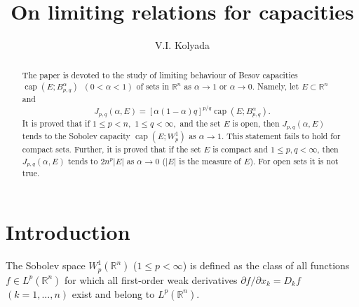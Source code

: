 \documentclass[12pt,twoside,reqno]{amsart}
\numberwithin{equation}{section}
\theoremstyle{definition}
\numberwithin{equation}{section}
\begin{document}
\title[Limiting relations]{On limiting relations for capacities}

\author[V.I. Kolyada]{V.I. Kolyada}
\address{Department of Mathematics\\
Karlstad University\\
Universitetsgatan 1 \\
651 88 Karlstad\\
SWEDEN} 


\begin{abstract}

The paper is devoted to the study of limiting behaviour of Besov
capacities ${\operatorname{cap}} (E;B_{p,q}^{\alpha})\,\,\, (0<{\alpha}<1)$ of sets in ${\mathbb{R}}^n$ as ${\alpha}\to 1$ or
${\alpha}\to 0.$ Namely, let $E\subset {\mathbb{R}}^n$ and
$$J_{p,q}({\alpha},
E)=[{\alpha}(1-{\alpha})q]^{p/q}{\operatorname{cap}}(E;B_{p,q}^{\alpha}).$$ It is proved that if $1\le
p<n,\,\,1\le q<\infty,$ and the set $E$ is open, then $J_{p,q}({\alpha},
E)$ tends to the Sobolev capacity ${\operatorname{cap}}(E;W_p^1)$ as ${\alpha}\to 1$.
This statement fails to hold for compact sets. Further, it is proved
that if the set $E$ is compact and $1\le p,q<\infty$, then
$J_{p,q}({\alpha}, E)$ tends to $2n^p|E|$ as ${\alpha}\to 0$ ($|E|$ is the  measure of $E$). For open sets it
is not true.

\end{abstract}


\maketitle

\date{}

\maketitle

\section{Introduction}

 The Sobolev space
$W_p^1({\mathbb{R}}^n)$ ($1\le p<\infty$) is defined as the class  of all
functions $f\in L^p({\mathbb R}^n)$ for which all first-order weak
derivatives $\partial f/\partial x_k=D_kf$ $(k=1,...,n)$ exist and
belong to $L^p({\mathbb R}^n)$.
\end{document}
